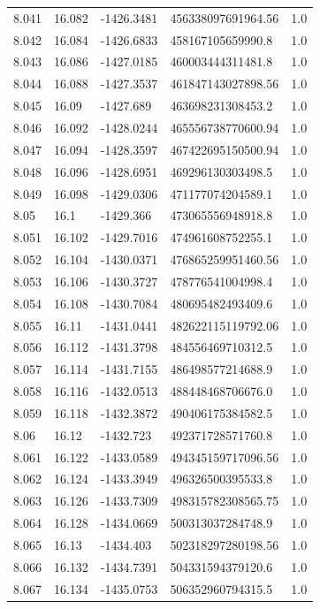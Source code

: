 \begin{tabular}{lllll}
8.041 & 16.082 & -1426.3481 & 456338097691964.56 & 1.0 \\
8.042 & 16.084 & -1426.6833 & 458167105659990.8 & 1.0 \\
8.043 & 16.086 & -1427.0185 & 460003444311481.8 & 1.0 \\
8.044 & 16.088 & -1427.3537 & 461847143027898.56 & 1.0 \\
8.045 & 16.09 & -1427.689 & 463698231308453.2 & 1.0 \\
8.046 & 16.092 & -1428.0244 & 465556738770600.94 & 1.0 \\
8.047 & 16.094 & -1428.3597 & 467422695150500.94 & 1.0 \\
8.048 & 16.096 & -1428.6951 & 469296130303498.5 & 1.0 \\
8.049 & 16.098 & -1429.0306 & 471177074204589.1 & 1.0 \\
8.05 & 16.1 & -1429.366 & 473065556948918.8 & 1.0 \\
8.051 & 16.102 & -1429.7016 & 474961608752255.1 & 1.0 \\
8.052 & 16.104 & -1430.0371 & 476865259951460.56 & 1.0 \\
8.053 & 16.106 & -1430.3727 & 478776541004998.4 & 1.0 \\
8.054 & 16.108 & -1430.7084 & 480695482493409.6 & 1.0 \\
8.055 & 16.11 & -1431.0441 & 482622115119792.06 & 1.0 \\
8.056 & 16.112 & -1431.3798 & 484556469710312.5 & 1.0 \\
8.057 & 16.114 & -1431.7155 & 486498577214688.9 & 1.0 \\
8.058 & 16.116 & -1432.0513 & 488448468706676.0 & 1.0 \\
8.059 & 16.118 & -1432.3872 & 490406175384582.5 & 1.0 \\
8.06 & 16.12 & -1432.723 & 492371728571760.8 & 1.0 \\
8.061 & 16.122 & -1433.0589 & 494345159717096.56 & 1.0 \\
8.062 & 16.124 & -1433.3949 & 496326500395533.8 & 1.0 \\
8.063 & 16.126 & -1433.7309 & 498315782308565.75 & 1.0 \\
8.064 & 16.128 & -1434.0669 & 500313037284748.9 & 1.0 \\
8.065 & 16.13 & -1434.403 & 502318297280198.56 & 1.0 \\
8.066 & 16.132 & -1434.7391 & 504331594379120.6 & 1.0 \\
8.067 & 16.134 & -1435.0753 & 506352960794315.5 & 1.0 \\

\end{tabular}
